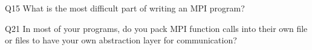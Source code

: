 \begin{description}%
\item{Q15} What is the most difficult part of writing an MPI program?%
\item{Q21} In most of your programs, do you pack MPI function calls into their own file or files to have your own abstraction layer for communication?%
\end{description}%
